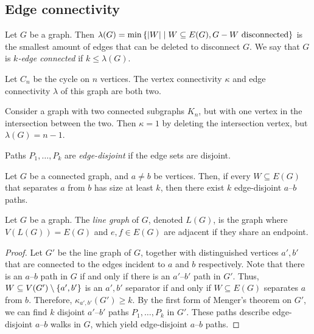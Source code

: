 \subsection{Edge connectivity}
\begin{definition}
	Let \( G \) be a graph.
	Then \( \lambda(G) = \min\qty{\abs{W} \mid W \subseteq E(G), G - W \text{ disconnected}} \) is the smallest amount of edges that can be deleted to disconnect \( G \).	
	We say that \( G \) is \emph{\( k \)-edge connected} if \( k \leq \lambda(G) \).
\end{definition}
\begin{example}
	Let \( C_n \) be the cycle on \( n \) vertices.
	The vertex connectivity \( \kappa \) and edge connectivity \( \lambda \) of this graph are both two.
\end{example}
\begin{example}
	Consider a graph with two connected subgraphs \( K_n \), but with one vertex in the intersection between the two.
	Then \( \kappa = 1 \) by deleting the intersection vertex, but \( \lambda(G) = n - 1 \).
\end{example}
\begin{definition}
	Paths \( P_1, \dots, P_k \) are \emph{edge-disjoint} if the edge sets are disjoint.
\end{definition}
\begin{theorem}
	Let \( G \) be a connected graph, and \( a \neq b \) be vertices.
	Then, if every \( W \subseteq E(G) \) that separates \( a \) from \( b \) has size at least \( k \), then there exist \( k \) edge-disjoint \( a \)--\( b \) paths.
\end{theorem}
\begin{definition}
	Let \( G \) be a graph.
	The \emph{line graph} of \( G \), denoted \( L(G) \), is the graph where \( V(L(G)) = E(G) \) and \( e,f \in E(G) \) are adjacent if they share an endpoint.
\end{definition}
\begin{proof}
	Let \( G' \) be the line graph of \( G \), together with distinguished vertices \( a', b' \) that are connected to the edges incident to \( a \) and \( b \) respectively.
	Note that there is an \( a \)--\( b \) path in \( G \) if and only if there is an \( a' \)--\( b' \) path in \( G' \).
	Thus, \( W \subseteq V(G') \setminus \qty{a',b'} \) is an \( a',b' \) separator if and only if \( W \subseteq E(G) \) separates \( a \) from \( b \).
	Therefore, \( \kappa_{a',b'}(G') \geq k \).
	By the first form of Menger's theorem on \( G' \), we can find \( k \) disjoint \( a' \)--\( b' \) paths \( P_1, \dots, P_k \) in \( G' \).
	These paths describe edge-disjoint \( a \)--\( b \) walks in \( G \), which yield edge-disjoint \( a \)--\( b \) paths.
\end{proof}
